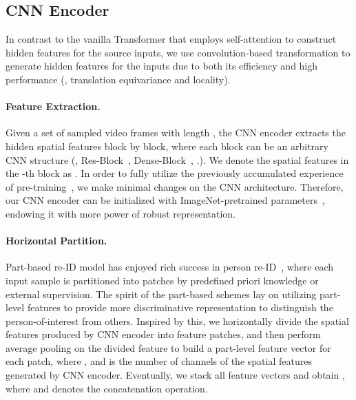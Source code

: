 \documentclass[10pt,twocolumn,letterpaper]{article}
\begin{document}
\subsection{CNN Encoder}
In contrast to the vanilla Transformer that employs self-attention to construct hidden features for the source inputs, we use convolution-based transformation to generate hidden features for the inputs due to both its efficiency and high performance (\eg, translation equivariance and locality).

\vspace{-2mm}
\paragraph{Feature Extraction.}
Given a set of sampled video frames  with length , the CNN encoder extracts the hidden spatial features block by block, where each block can be an arbitrary CNN structure (\eg, Res-Block~\cite{he2016deep}, Dense-Block~\cite{huang2017densely}, \etc.). We denote the spatial features in the -th block as .
In order to fully utilize the previously accumulated experience of pre-training~\cite{zheng2016mars}, we make minimal changes on the CNN architecture. Therefore, our CNN encoder can be initialized with ImageNet-pretrained parameters~\cite{deng2009imagenet}, endowing it with more power of robust representation.

\vspace{-2mm}
\paragraph{Horizontal Partition.}
Part-based re-ID model has enjoyed rich success in person re-ID~\cite{varior2016siamese,sun2018beyond,li2017learning,fu2019horizontal}, where each input sample is partitioned into patches by predefined priori knowledge or external supervision. The spirit of the part-based schemes lay on utilizing part-level features to provide more discriminative representation to distinguish the person-of-interest from others. Inspired by this, we horizontally divide the spatial features  produced by CNN encoder into  feature patches, and then perform average pooling on the divided feature to build a part-level feature vector  for each patch, where , and  is the number of channels of the spatial features generated by CNN encoder. Eventually, we stack all feature vectors and obtain , where  and  denotes the concatenation operation.
\end{document}
